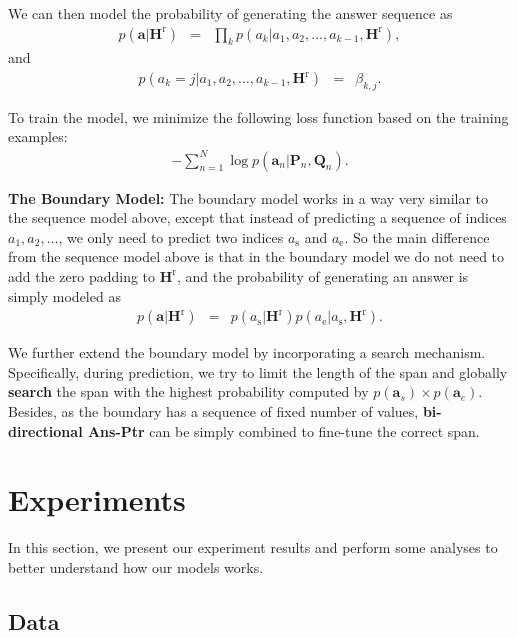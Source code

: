 \documentclass{article} \usepackage{iclr2017_conference,times}
\begin{document}
We can then model the probability of generating the answer sequence as
\begin{eqnarray}
p(\mathbf{a} | \mathbf{H}^\text{r}) & = & \prod_{k} p(a_k | a_1, a_2, \ldots, a_{k-1}, \mathbf{H}^\text{r}),
\end{eqnarray}
and
\begin{eqnarray}
p(a_k = j | a_1, a_2, \ldots, a_{k-1}, \mathbf{H}^\text{r}) & = & \beta_{k, j}.
\end{eqnarray}

To train the model, we minimize the following loss function based on the training examples:
\begin{eqnarray}
-\sum_{n = 1}^N \log p(\mathbf{a}_n | \mathbf{P}_n, \mathbf{Q}_n).
\end{eqnarray}

\noindent \textbf{The Boundary Model:} The boundary model works in a way very similar to the sequence model above, except that instead of predicting a sequence of indices $a_1, a_2, \ldots$, we only need to predict two indices $a_\text{s}$ and $a_\text{e}$.
So the main difference from the sequence model above is that in the boundary model we do not need to add the zero padding to $\mathbf{H}^\text{r}$, and the probability of generating an answer is simply modeled as
\begin{eqnarray}
p(\mathbf{a} | \mathbf{H}^\text{r}) & = & p(a_\text{s} | \mathbf{H}^\text{r}) p(a_\text{e} | a_\text{s}, \mathbf{H}^\text{r}).
\end{eqnarray}

We further extend the boundary model by incorporating a search mechanism. 
Specifically, during prediction, we try to limit the length of the span and globally \textbf{search} the span with the highest probability computed by $p(\mathbf{a}_s)\times p(\mathbf{a}_e)$. 
Besides, as the boundary has a sequence of fixed number of values, \textbf{bi-directional Ans-Ptr} can be simply combined to fine-tune the correct span.
 \section{Experiments}

In this section, we present our experiment results and perform some analyses to better understand how our models works.

\subsection{Data}
\end{document}
